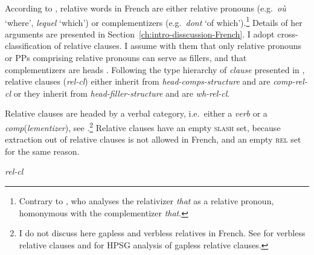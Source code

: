 According to \citet{Godard.1988}, relative words in French are either relative pronouns (e.g.\ \emph{où} `where', \emph{lequel} `which') or complementizers (e.g.\ \emph{dont} `of which').\footnote{Contrary to \citet{Sag.1997}, who analyses the relativizer \emph{that} as a relative pronoun, homonymous with the complementizer \emph{that}.} Details of her arguments are presented in Section~\ref{ch:intro-disscussion-French}. I adopt  cross-classification of relative clauses.
I assume with them that only relative pronouns or PPs comprising relative pronouns can serve as fillers, and that complementizers are heads \citep[see also][]{Borsley.2020.HPSG.UDC}. Following the type hierarchy of \emph{clause} presented in , relative clauses (\textit{rel-cl}) either inherit from \textit{head-comps-structure} and are \textit{comp-rel-cl} or they inherit from \textit{head-filler-structure} and are \textit{wh-rel-cl}. 

Relative clauses are headed by a verbal category, i.e.\ either a \emph{verb} or a \textit{comp}(\textit{lementizer}), see .\footnote{I do not discuss here gapless and verbless relatives in French. See \citet{Bilbiie.2010} for verbless relative clauses and \citet{Abeille.2007.Relatives} for HPSG analysis of gapless relative clauses.} Relative clauses have an empty \textsc{slash} set, because extraction out of relative clauses is not allowed in French, and an empty \textsc{rel} set for the same reason.

\ea \textit{rel-cl} 
\z\largerpage[-1]\pagebreak

